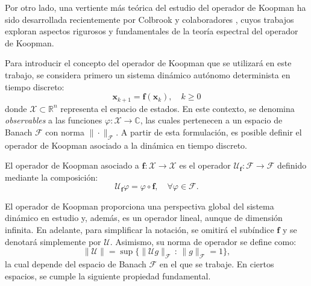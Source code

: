 Por otro lado, una vertiente más teórica del estudio del operador de Koopman ha sido desarrollada recientemente por Colbrook y colaboradores \cite{Colbrook2023ResidualKoopmanism, Colbrook2023THESYSTEMS, Colbrook2024TheAlgorithms, Colbrook2024RiggedOperators, Colbrook2024RigorousSystems, Colbrook2024LimitsLearning, Zagli2024BridgingResponse}, cuyos trabajos exploran aspectos rigurosos y fundamentales de la teoría espectral del operador de Koopman.  

Para introducir el concepto del operador de Koopman que se utilizará en este trabajo, se considera primero un sistema dinámico autónomo determinista en tiempo discreto:  
\begin{equation}
	\mathbf{x}_{k+1} = \mathbf{f}(\mathbf{x}_k), \quad k \geq 0
	\label{eq:NL}
	\tag{NL}
\end{equation}
donde $\mathcal{X} \subset \mathbb{R}^n$ representa el espacio de estados. En este contexto, se denomina \textit{observables} a las funciones $\varphi: \mathcal{X} \to \mathbb{C}$, las cuales pertenecen a un espacio de Banach $\mathcal{F}$ con norma $\|\cdot\|_{\mathcal{F}}$. A partir de esta formulación, es posible definir el operador de Koopman asociado a la dinámica en tiempo discreto.  

\begin{defn}
    El operador de Koopman asociado a $\mathbf{f}: \mathcal{X} \to \mathcal{X}$ es el operador $\mathcal{U}_{\mathbf{f}}: \mathcal{F} \to \mathcal{F}$ definido mediante la composición:
    \begin{equation*}
        \mathcal{U}_{\mathbf{f}} \varphi = \varphi \circ \mathbf{f}, \quad \forall \varphi \in \mathcal{F}.
    \end{equation*}
\end{defn}

\noindent El operador de Koopman proporciona una perspectiva global del sistema dinámico en estudio y, además, es un operador lineal, aunque de dimensión infinita.  
En adelante, para simplificar la notación, se omitirá el subíndice $\mathbf{f}$ y se denotará simplemente por $\mathcal{U}$. Asimismo, su norma de operador se define como:
\begin{equation*}
    \|\mathcal{U}\| = \sup \{ \|\mathcal{U} g\|_{\mathcal{F}} \, : \, \|g\|_{\mathcal{F}} = 1 \},
\end{equation*}
la cual depende del espacio de Banach $\mathcal{F}$ en el que se trabaje. En ciertos espacios, se cumple la siguiente propiedad fundamental.

